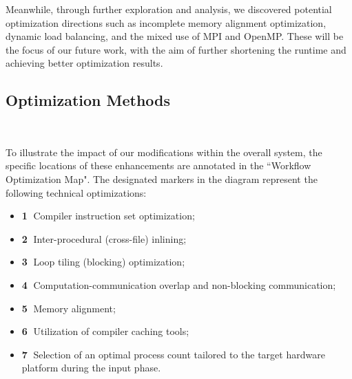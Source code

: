 Meanwhile, through further exploration and analysis, we discovered potential optimization directions such as incomplete memory alignment optimization, dynamic load balancing, and the mixed use of MPI and OpenMP. 
These will be the focus of our future work, with the aim of further shortening the runtime and achieving better optimization results.


\subsection{Optimization Methods}
\ 



To illustrate the impact of our modifications within the overall system, the specific locations of these enhancements are annotated in the ``Workflow Optimization Map".
The designated markers in the diagram represent the following technical optimizations:
\begin{itemize}
\item \textbf{\textcircled{1}} Compiler instruction set optimization;
\item \textbf{\textcircled{2}} Inter-procedural (cross-file) inlining;
\item \textbf{\textcircled{3}} Loop tiling (blocking) optimization;
\item \textbf{\textcircled{4}} Computation-communication overlap and non-blocking communication;
\item \textbf{\textcircled{5}} Memory alignment;
\item \textbf{\textcircled{6}} Utilization of compiler caching tools;
\item \textbf{\textcircled{7}} Selection of an optimal process count tailored to the target hardware platform during the input phase.
\end{itemize}

